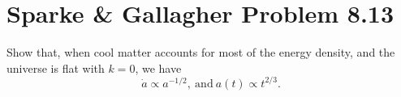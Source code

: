\documentclass[]{article}
\begin{document}
\section{Sparke \& Gallagher Problem 8.13}

Show that, when cool matter accounts for most of the energy density, and the universe
is flat with $k=0$, we have
\begin{equation}
\dot{a}\propto a^{-1/2},~\mathrm{and}~a(t)\propto t^{2/3}.
\end{equation}
\end{document}
